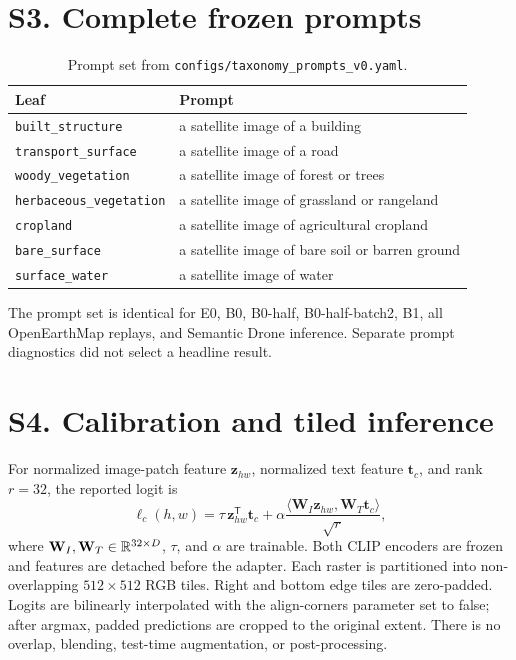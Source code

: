 \section*{S3. Complete frozen prompts}
\begin{table}[H]
\centering
\caption{Prompt set from \texttt{configs/taxonomy\_prompts\_v0.yaml}.}
\begin{tabular}{ll}
\toprule
Leaf & Prompt \\
\midrule
\texttt{built\_structure} & a satellite image of a building \\
\texttt{transport\_surface} & a satellite image of a road \\
\texttt{woody\_vegetation} & a satellite image of forest or trees \\
\texttt{herbaceous\_vegetation} & a satellite image of grassland or rangeland \\
\texttt{cropland} & a satellite image of agricultural cropland \\
\texttt{bare\_surface} & a satellite image of bare soil or barren ground \\
\texttt{surface\_water} & a satellite image of water \\
\bottomrule
\end{tabular}
\end{table}
The prompt set is identical for E0, B0, B0-half, B0-half-batch2, B1, all OpenEarthMap replays, and Semantic Drone inference. Separate prompt diagnostics did not select a headline result.

\section*{S4. Calibration and tiled inference}
For normalized image-patch feature \(\mathbf z_{hw}\), normalized text feature \(\mathbf t_c\), and rank \(r=32\), the reported logit is
\[
\ell_c(h,w)=\tau\,\mathbf z_{hw}^{\mathsf T}\mathbf t_c+
\alpha\frac{\langle\mathbf W_I\mathbf z_{hw},\mathbf W_T\mathbf t_c\rangle}{\sqrt r},
\]
where \(\mathbf W_I,\mathbf W_T\in\mathbb{R}^{32\times D}\), \(\tau\), and \(\alpha\) are trainable. Both CLIP encoders are frozen and features are detached before the adapter. Each raster is partitioned into non-overlapping \(512\times512\) RGB tiles. Right and bottom edge tiles are zero-padded. Logits are bilinearly interpolated with the align-corners parameter set to false; after argmax, padded predictions are cropped to the original extent. There is no overlap, blending, test-time augmentation, or post-processing.

